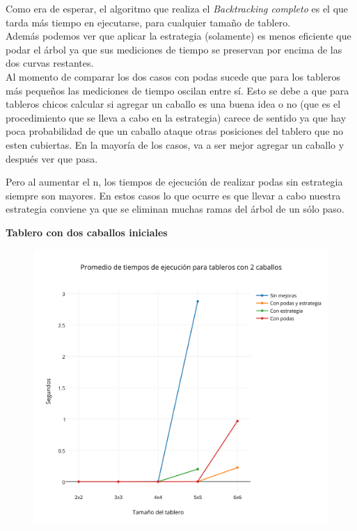 Como era de esperar, el algoritmo que realiza el \emph{Backtracking completo} es el que tarda más tiempo en ejecutarse, para cualquier tamaño de tablero.\\

Adem\'as podemos ver que aplicar la estrategia (solamente) es menos eficiente que podar el árbol ya que sus mediciones de tiempo se preservan por encima de las dos curvas restantes.\\

Al momento de comparar los dos casos con podas sucede que para los tableros más pequeños las mediciones de tiempo oscilan entre sí. Esto se debe a que para tableros chicos calcular si agregar un caballo es una buena idea o no (que es el procedimiento que se lleva a cabo en la estrategia) carece de sentido ya que hay poca probabilidad de que un caballo ataque otras posiciones del tablero que no esten cubiertas. En la mayoría de los casos, va a ser mejor agregar un caballo y después ver que pasa.

Pero al aumentar el n, los tiempos de ejecución de realizar podas sin estrategia siempre son mayores. En estos casos lo que ocurre es que llevar a cabo nuestra estrategia conviene ya que se eliminan muchas ramas del árbol de un sólo paso.

\newpage

\textbf{{\Large Tablero con dos caballos iniciales}}
 \begin{figure}[h!]
   \begin{center}
   	\includegraphics[scale=0.3]{../src/ej3/Mediciones/2caballos/promedios1.png} 
   \end{center}
 \end{figure}
   \newpage

